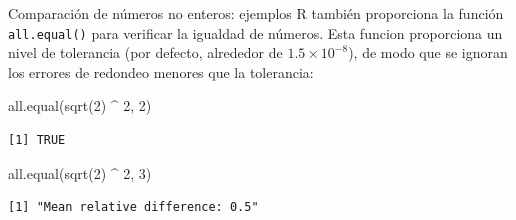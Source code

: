\documentclass[
  ignorenonframetext,
  aspectratio=169,
  spanish,
]{beamer}
\newenvironment{Shaded}{\begin{snugshade}}{\end{snugshade}}
\newcommand{\DecValTok}[1]{\textcolor[rgb]{0.68,0.00,0.00}{#1}}
\newcommand{\FunctionTok}[1]{\textcolor[rgb]{0.28,0.35,0.67}{#1}}
\newcommand{\NormalTok}[1]{\textcolor[rgb]{0.00,0.23,0.31}{#1}}
\newcommand{\SpecialCharTok}[1]{\textcolor[rgb]{0.37,0.37,0.37}{#1}}
\begin{document}
\begin{frame}[fragile]{Comparación de números no enteros: ejemplos}
\label{comparaciuxf3n-de-nuxfameros-no-enteros-ejemplos-1}
R también proporciona la función \texttt{all.equal()} para verificar la
igualdad de números. Esta funcion proporciona un nivel de tolerancia
(por defecto, alrededor de \(1.5\times 10^{-8}\)), de modo que se
ignoran los errores de redondeo menores que la tolerancia:

\begin{Shaded}
\begin{Highlighting}[]
\FunctionTok{all.equal}\NormalTok{(}\FunctionTok{sqrt}\NormalTok{(}\DecValTok{2}\NormalTok{) }\SpecialCharTok{\^{}} \DecValTok{2}\NormalTok{, }\DecValTok{2}\NormalTok{)}
\end{Highlighting}
\end{Shaded}

\begin{verbatim}
[1] TRUE
\end{verbatim}

\begin{Shaded}
\begin{Highlighting}[]
\FunctionTok{all.equal}\NormalTok{(}\FunctionTok{sqrt}\NormalTok{(}\DecValTok{2}\NormalTok{) }\SpecialCharTok{\^{}} \DecValTok{2}\NormalTok{, }\DecValTok{3}\NormalTok{)}
\end{Highlighting}
\end{Shaded}

\begin{verbatim}
[1] "Mean relative difference: 0.5"
\end{verbatim}
\end{frame}
\end{document}
